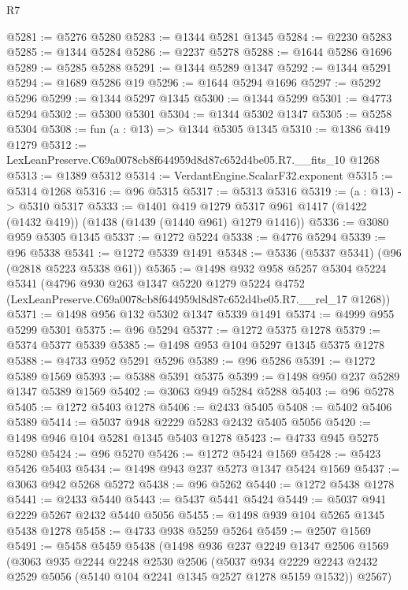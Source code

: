 \begin{lexlean}{R7}
\begin{coremodule}
@5281 := @5276 @5280
@5283 := @1344 @5281 @1345
@5284 := @2230 @5283
@5285 := @1344 @5284
@5286 := @2237 @5278
@5288 := @1644 @5286 @1696
@5289 := @5285 @5288
@5291 := @1344 @5289 @1347
@5292 := @1344 @5291
@5294 := @1689 @5286 @19
@5296 := @1644 @5294 @1696
@5297 := @5292 @5296
@5299 := @1344 @5297 @1345
@5300 := @1344 @5299
@5301 := @4773 @5294
@5302 := @5300 @5301
@5304 := @1344 @5302 @1347
@5305 := @5258 @5304
@5308 := fun (a : @13) => @1344 @5305 @1345
@5310 := @1386 @419 @1279
@5312 := LexLeanPreserve.C69a0078cb8f644959d8d87c652d4be05.R7.__fits_10 @1268
@5313 := @1389 @5312
@5314 := VerdantEngine.ScalarF32.exponent
@5315 := @5314 @1268
@5316 := @96 @5315
@5317 := @5313 @5316
@5319 := (a : @13) -> @5310 @5317
@5333 := @1401
    @419
    @1279
    @5317
    @961
    @1417
    (@1422 (@1432 @419))
    (@1438 (@1439 (@1440 @961) @1279 @1416))
@5336 := @3080 @959 @5305 @1345
@5337 := @1272 @5224
@5338 := @4776 @5294
@5339 := @96 @5338
@5341 := @1272 @5339 @1491
@5348 := @5336 (@5337 @5341) (@96 (@2818 @5223 @5338 @61))
@5365 := @1498
    @932
    @958
    @5257
    @5304
    @5224
    @5341
    (@4796
      @930
      @263
      @1347
      @5220
      @1279
      @5224
      @4752
      (LexLeanPreserve.C69a0078cb8f644959d8d87c652d4be05.R7.__rel_17 @1268))
@5371 := @1498 @956 @132 @5302 @1347 @5339 @1491
@5374 := @4999 @955 @5299 @5301
@5375 := @96 @5294
@5377 := @1272 @5375 @1278
@5379 := @5374 @5377 @5339
@5385 := @1498 @953 @104 @5297 @1345 @5375 @1278
@5388 := @4733 @952 @5291 @5296
@5389 := @96 @5286
@5391 := @1272 @5389 @1569
@5393 := @5388 @5391 @5375
@5399 := @1498 @950 @237 @5289 @1347 @5389 @1569
@5402 := @3063 @949 @5284 @5288
@5403 := @96 @5278
@5405 := @1272 @5403 @1278
@5406 := @2433 @5405
@5408 := @5402 @5406 @5389
@5414 := @5037 @948 @2229 @5283 @2432 @5405 @5056
@5420 := @1498 @946 @104 @5281 @1345 @5403 @1278
@5423 := @4733 @945 @5275 @5280
@5424 := @96 @5270
@5426 := @1272 @5424 @1569
@5428 := @5423 @5426 @5403
@5434 := @1498 @943 @237 @5273 @1347 @5424 @1569
@5437 := @3063 @942 @5268 @5272
@5438 := @96 @5262
@5440 := @1272 @5438 @1278
@5441 := @2433 @5440
@5443 := @5437 @5441 @5424
@5449 := @5037 @941 @2229 @5267 @2432 @5440 @5056
@5455 := @1498 @939 @104 @5265 @1345 @5438 @1278
@5458 := @4733 @938 @5259 @5264
@5459 := @2507 @1569
@5491 := @5458
    @5459
    @5438
    (@1498
      @936
      @237
      @2249
      @1347
      @2506
      @1569
      (@3063
        @935
        @2244
        @2248
        @2530
        @2506
        (@5037 @934 @2229 @2243 @2432 @2529 @5056 (@5140 @104 @2241 @1345 @2527 @1278 @5159 @1532))
        @2567)

\end{coremodule}
\end{lexlean}
